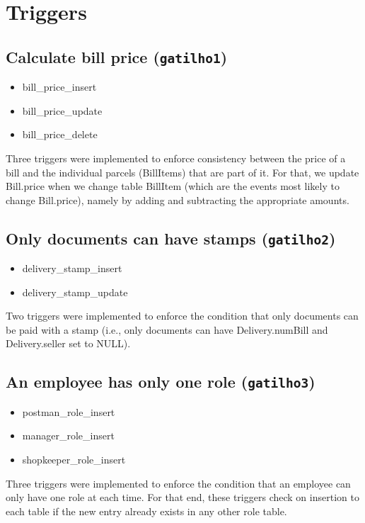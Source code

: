 \documentclass{report}[a4paper]
\theoremstyle{remark}
\begin{document}
\chapter{Triggers}
\section{Calculate bill price (\texttt{gatilho1})}
\begin{itemize}
    \item bill\_price\_insert
    \item bill\_price\_update
    \item bill\_price\_delete
\end{itemize}
Three triggers were implemented to enforce consistency between the price of a bill and the individual parcels (BillItems) that are part of it. For that, we update Bill.price when we change table BillItem (which are the events most likely to change Bill.price), namely by adding and subtracting the appropriate amounts.

\section{Only documents can have stamps (\texttt{gatilho2})}
\begin{itemize}
    \item delivery\_stamp\_insert
    \item delivery\_stamp\_update
\end{itemize}
Two triggers were implemented to enforce the condition that only documents can be paid with a stamp (i.e., only documents can have Delivery.numBill and Delivery.seller set to NULL).

\section{An employee has only one role (\texttt{gatilho3})}
\begin{itemize}
    \item postman\_role\_insert
    \item manager\_role\_insert
    \item shopkeeper\_role\_insert
\end{itemize}
Three triggers were implemented to enforce the condition that an employee can only have one role at each time. For that end, these triggers check on insertion to each table if the new entry already exists in any other role table.
\end{document}
